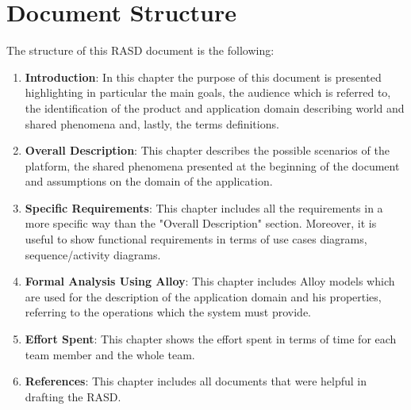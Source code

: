 \section{Document Structure}
The structure of this RASD document is the following:
\begin{enumerate}
    \item \textbf{Introduction}: In this chapter the purpose of this document is presented highlighting in particular the main goals, the audience which is referred to, the identification of the product and application domain  describing world and shared phenomena and, lastly, the terms definitions.
    \item \textbf{Overall Description}: This chapter describes the possible scenarios of the platform, the shared phenomena presented at the beginning of the document and assumptions on the domain of the application.
    \item \textbf{Specific Requirements}: This chapter includes all the requirements in a more specific way than the "Overall Description" section. Moreover, it is useful to show functional requirements in terms of use cases diagrams, sequence/activity diagrams.
    \item \textbf{Formal Analysis Using Alloy}: This chapter includes Alloy models which are used for the description of the application domain and his properties, referring to the operations which the system must provide.
    \item \textbf{Effort Spent}: This chapter shows the effort spent in terms of time for each team member and the whole team.
    \item \textbf{References}: This chapter includes all documents that were helpful in drafting the RASD.
\end{enumerate}